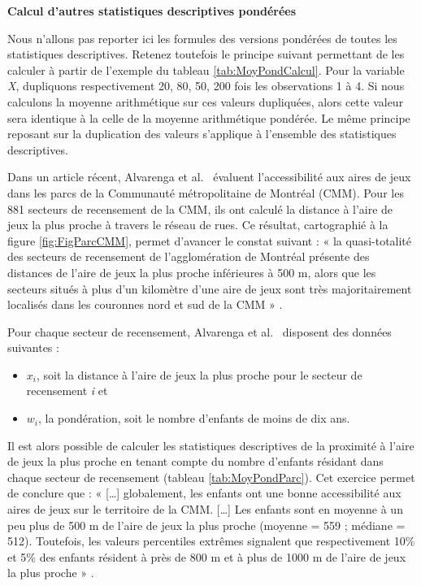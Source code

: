 \documentclass[
  11pt,
  french,
]{book}
\makeatletter
\providecommand{\tightlist}{%
  \setlength{\itemsep}{0pt}\setlength{\parskip}{0pt}}
\newenvironment{kframev}{%
\medskip{}
\setlength{\fboxsep}{.8em}
 \def\at@end@of@kframev{}%
 \ifinner\ifhmode%
  \def\at@end@of@kframev{\end{minipage}}%
  \begin{minipage}{\columnwidth}%
 \fi\fi%
 \def\FrameCommand##1{\hskip\@totalleftmargin \hskip-\fboxsep
 \colorbox{shadebluecolor}{##1}\hskip-\fboxsep
     \hskip-\linewidth \hskip-\@totalleftmargin \hskip\columnwidth}%
 \MakeFramed {\advance\hsize-\width
   \@totalleftmargin\z@ \linewidth\hsize
   \@setminipage}}%
 {\par\unskip\endMakeFramed%
 \at@end@of@kframev}
\newenvironment{rmdblock}[1]
  {
  \begin{itemize}
  \renewcommand{\labelitemi}{
    \raisebox{-.7\height}[0pt][0pt]{
      {\setkeys{Gin}{width=3em,keepaspectratio}\texttt{[image: images/\#1]}}
    }
  }
  \setlength{\fboxsep}{1em}
  \begin{kframev}
  \small
  \item
  }
  {
  \end{kframev}
  \end{itemize}
  }
\newenvironment{bloc_notes}
  {\begin{rmdblock}{notes}}
  {\end{rmdblock}}
\makeatother
\begin{document}
\begin{bloc_notes}
\textbf{Calcul d'autres statistiques descriptives pondérées}

Nous n'allons pas reporter ici les formules des versions pondérées de toutes les statistiques descriptives. Retenez toutefois le principe suivant permettant de les calculer à partir de l'exemple du tableau \ref{tab:MoyPondCalcul}. Pour la variable \emph{X}, dupliquons respectivement 20, 80, 50, 200 fois les observations 1 à 4. Si nous calculons la moyenne arithmétique sur ces valeurs dupliquées, alors cette valeur sera identique à la celle de la moyenne arithmétique pondérée. Le même principe reposant sur la duplication des valeurs s'applique à l'ensemble des statistiques descriptives.

\end{bloc_notes}

Dans un article récent, Alvarenga et al.~\citeyearpar{de2018accessibilite} évaluent l'accessibilité aux aires de jeux dans les parcs de la Communauté métropolitaine de Montréal (CMM). Pour les 881 secteurs de recensement de la CMM, ils ont calculé la distance à l'aire de jeux la plus proche à travers le réseau de rues. Ce résultat, cartographié à la figure \ref{fig:FigParcCMM}, permet d'avancer le constat suivant : « la quasi-totalité des secteurs de recensement de l'agglomération de Montréal présente des distances de l'aire de jeux la plus proche inférieures à 500 m, alors que les secteurs situés à plus d'un kilomètre d'une aire de jeux sont très majoritairement localisés dans les couronnes
nord et sud de la CMM » \citep[p.~238]{de2018accessibilite}.

Pour chaque secteur de recensement, Alvarenga et al.~\citeyearpar{de2018accessibilite} disposent des données suivantes :

\begin{itemize}
\tightlist
\item
  \(x_i\), soit la distance à l'aire de jeux la plus proche pour le secteur de recensement \emph{i} et
\item
  \(w_i\), la pondération, soit le nombre d'enfants de moins de dix ans.
\end{itemize}

Il est alors possible de calculer les statistiques descriptives de la proximité à l'aire de jeux la plus proche en tenant compte du nombre d'enfants résidant dans chaque secteur de recensement (tableau \ref{tab:MoyPondParc}). Cet exercice permet de conclure que : « {[}\ldots{]} globalement, les enfants ont une bonne accessibilité aux aires de jeux sur le territoire de la CMM. {[}\ldots{]} Les enfants sont en moyenne à un peu plus de 500 m de l'aire de jeux la plus proche (moyenne = 559 ; médiane = 512). Toutefois, les valeurs percentiles extrêmes signalent que respectivement 10\% et 5\% des enfants résident à près de 800 m et à plus de 1000 m de l'aire de jeux la plus proche » \citeyearpar[p.~236]{de2018accessibilite}.
\end{document}
